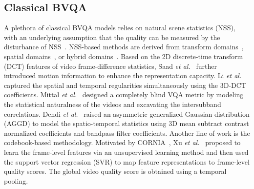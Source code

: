\documentclass[journal]{IEEEtran}
\begin{document}
\subsection{Classical BVQA}\label{subsec:classical_bvqa}
A plethora of classical BVQA models relies on natural scene statistics (NSS), with an underlying assumption that the quality can be measured by the disturbance of NSS~\cite{yan2016blind}. NSS-based methods are derived from transform domains~\cite{moorthy2011blind, saad2012blind}, spatial domains~\cite{mittal2012no, mittal2013making}, or hybrid domains~\cite{ghadiyaram2017perceptual, ma2018blind}. Based on the 2D discrete-time transform (DCT) features of video frame-difference statistics, Saad \textit{et al.}~\cite{saad2014blind} further introduced motion information to enhance the representation capacity. Li \textit{et al.}~\cite{li2016spatiotemporal} captured the spatial and temporal regularities simultaneously using the 3D-DCT coefficients.  Mittal \textit{et al.}~\cite{mittal2016completely} designed a completely blind VQA metric by modeling the statistical naturalness of the videos and excavating the intersubband correlations. Dendi \textit{et al.}~\cite{dendi2020no} raised an asymmetric generalized Gaussian distribution (AGGD) to model the spatio-temporal statistics using 3D mean subtract contrast normalized coefficients and bandpass filter coefficients. Another line of work is the codebook-based methodology. Motivated by CORNIA~\cite{ye2012unsupervised}, Xu \textit{et al.}~\cite{xu2014no} proposed to learn the frame-level features via an unsupervised learning method and then used the support vector regression (SVR) to map feature representations to frame-level quality scores. The global video quality score is obtained using a temporal pooling.
\end{document}
